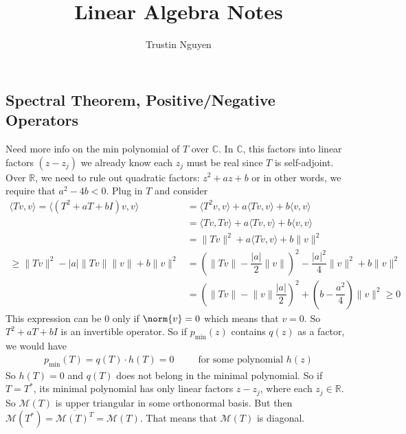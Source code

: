 \documentclass{article}
\title{Linear Algebra Notes}
\author{Trustin Nguyen}
\begin{document}
\maketitle
\reversemarginpar

\begin{topic}
	\section*{Spectral Theorem, Positive/Negative Operators}
\end{topic}

Need more info on the min polynomial of $T$ over $\mathbb{C}$. In $\mathbb{C}$, this factors into linear factors $(z - z_{j})$ we already know each $z_{j}$ must be real since $T$ is self-adjoint. Over $\mathbb{R}$, we need to rule out quadratic factors: $z^{2} + az + b$ or in other words, we require that $a^{2} - 4b <  0$. Plug in $T$ and consider
\begin{align*}
	\langle Tv, v \rangle = \langle (T^{2} + aT + bI)v, v \rangle &= \langle T^{2}v, v \rangle + a\langle Tv, v \rangle + b\langle v, v \rangle\\
						    &= \langle Tv, Tv \rangle + a\langle Tv, v \rangle + b\langle v, v \rangle \\
						    &= \lVert Tv \rVert^{2} + a\langle Tv, v \rangle + b\lVert v \rVert^{2}\\
	\geq  \lVert Tv \rVert^{2} - \lvert a \rvert\lVert Tv \rVert\lVert v \rVert + b\lVert v \rVert^{2} &= (\lVert Tv \rVert - \dfrac{\lvert a \rvert}{2}\lVert v \rVert)^{2}  - \dfrac{\lvert a \rvert^{2}}{4}\lVert v \rVert^{2} + b\lVert v \rVert^{2} \\
								       &= (\lVert Tv \rVert  - \lVert v \rVert\dfrac{\lvert a \rvert}{2})^{2} + (b - \dfrac{a^{2}}{4})\lVert v \rVert^{2} \geq 0
\end{align*}
This expression can be 0 only if $\norm{v} = 0$ which means that $v = 0$. So $T^{2} + aT + bI$ is an invertible operator. So if $p_{\text{min}}(z)$ contains $q(z)$ as a factor, we would have 
\begin{align*}
	p_{\text{min}}(T) =q(T)\cdot h(T) = 0 \hspace{30pt} \text{for some polynomial $h(z)$}
\end{align*}
So $h(T) = 0$ and $q(T)$ does not belong in the minimal polynomial. So if $T = T^{*}$, its minimal polynomial has only linear factors $z - z_{j}$, where each $z_{j} \in \mathbb{R}$. So $\mathcal{M}(T)$ is upper triangular in some orthonormal basis. But then $\mathcal{M}(T^{*}) = \overline{\mathcal{M}(T)^{T}} = \mathcal{M}(T)$. That means that $\mathcal{M}(T)$ is diagonal.
\end{document}
